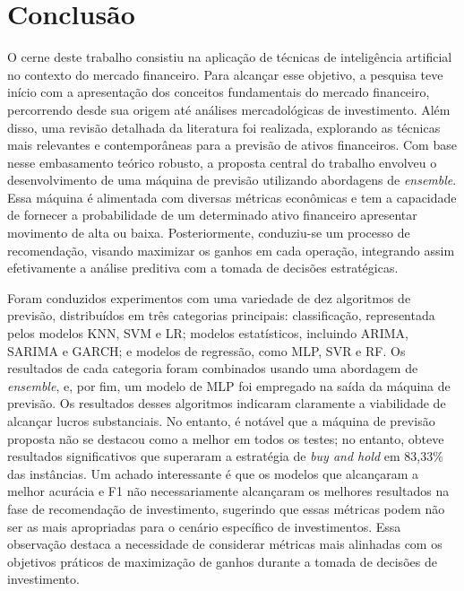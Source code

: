 \chapter{Conclusão}
\label{cap:conclusao}
O cerne deste trabalho consistiu na aplicação de técnicas de inteligência artificial no contexto do mercado financeiro. Para alcançar esse objetivo, a pesquisa teve início com a apresentação dos conceitos fundamentais do mercado financeiro, percorrendo desde sua origem até análises mercadológicas de investimento. Além disso, uma revisão detalhada da literatura foi realizada, explorando as técnicas mais relevantes e contemporâneas para a previsão de ativos financeiros.
Com base nesse embasamento teórico robusto, a proposta central do trabalho envolveu o desenvolvimento de uma máquina de previsão utilizando abordagens de \textit{ensemble}. Essa máquina é alimentada com diversas métricas econômicas e tem a capacidade de fornecer a probabilidade de um determinado ativo financeiro apresentar movimento de alta ou baixa. Posteriormente, conduziu-se um processo de recomendação, visando maximizar os ganhos em cada operação, integrando assim efetivamente a análise preditiva com a tomada de decisões estratégicas.

Foram conduzidos experimentos com uma variedade de dez algoritmos de previsão, distribuídos em três categorias principais: classificação, representada pelos modelos \ac{KNN}, \ac{SVM} e \ac{LR}; modelos estatísticos, incluindo \ac{ARIMA}, \ac{SARIMA} e \ac{GARCH}; e modelos de regressão, como \ac{MLP}, \ac{SVR} e \ac{RF}. Os resultados de cada categoria foram combinados usando uma abordagem de \textit{ensemble}, e, por fim, um modelo de \ac{MLP} foi empregado na saída da máquina de previsão.
Os resultados desses algoritmos indicaram claramente a viabilidade de alcançar lucros substanciais. No entanto, é notável que a máquina de previsão proposta não se destacou como a melhor em todos os testes; no entanto, obteve resultados significativos que superaram a estratégia de \textit{buy and hold} em 83,33\% das instâncias. Um achado interessante é que os modelos que alcançaram a melhor acurácia e \ac{F1} não necessariamente alcançaram os melhores resultados na fase de recomendação de investimento, sugerindo que essas métricas podem não ser as mais apropriadas para o cenário específico de investimentos. Essa observação destaca a necessidade de considerar métricas mais alinhadas com os objetivos práticos de maximização de ganhos durante a tomada de decisões de investimento.

